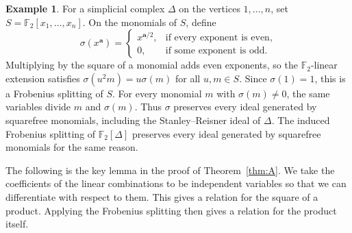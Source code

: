 \documentclass[a4paper,11pt]{amsart}
\theoremstyle{definition}
\newtheorem{example}[theorem]{Example}
\begin{document}
\begin{example}\label{ex:stanley-reisner-splitting}
For a simplicial complex $\Delta$ on the vertices $1,\ldots,n$, set $S=\mathbb F_2[x_1,\ldots,x_n]$. On the monomials of $S$, define
\[
\sigma(x^{\boldsymbol a})=\begin{cases}
x^{\boldsymbol a/2}, & \text{if every exponent is even},\\
0, & \text{if some exponent is odd}.
\end{cases}
\]
Multiplying by the square of a monomial adds even exponents, so the $\mathbb F_2$-linear extension satisfies $\sigma(u^2m)=u\sigma(m)$ for all $u,m\in S$. Since $\sigma(1)=1$, this is a Frobenius splitting of $S$. For every monomial $m$ with $\sigma(m)\ne0$, the same variables divide $m$ and $\sigma(m)$. Thus $\sigma$ preserves every ideal generated by squarefree monomials, including the Stanley--Reisner ideal of $\Delta$. The induced Frobenius splitting of $\mathbb F_2[\Delta]$ preserves every ideal generated by squarefree monomials for the same reason.
\end{example}

The following is the key lemma in the proof of Theorem~\ref{thm:A}. We take the coefficients of the linear combinations to be independent variables so that we can differentiate with respect to them. This gives a relation for the square of a product. Applying the Frobenius splitting then gives a relation for the product itself.
\end{document}

